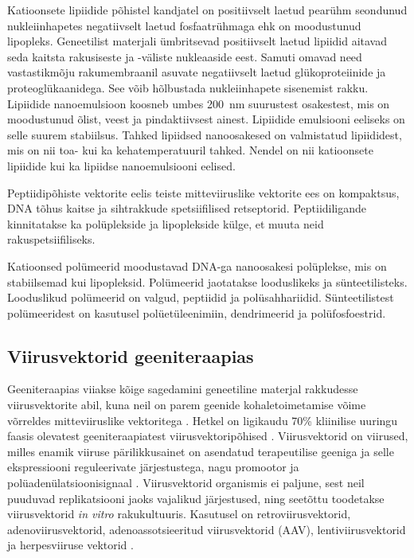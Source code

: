 \documentclass{trkut}%
\begin{document}
Katioonsete lipiidide põhistel kandjatel on positiivselt laetud pearühm seondunud nukleiinhapetes negatiivselt laetud fosfaatrühmaga ehk on moodustunud lipopleks. Geneetilist materjali ümbritsevad positiivselt laetud lipiidid aitavad seda kaitsta rakusiseste ja -väliste nukleaaside eest. Samuti omavad need vastastikmõju rakumembraanil asuvate negatiivselt laetud glükoproteiinide ja proteoglükaanidega. See võib hõlbustada nukleiinhapete sisenemist rakku. Lipiidide nanoemulsioon koosneb umbes \SI{200}{\nano\metre} suurustest osakestest, mis on moodustunud õlist, veest ja pindaktiivsest ainest. Lipiidide emulsiooni eeliseks on selle suurem stabiilsus. Tahked lipiidsed nanoosakesed on valmistatud lipiididest, mis on nii toa- kui ka kehatemperatuuril tahked. Nendel on nii katioonsete lipiidide kui ka lipiidse nanoemulsiooni eelised. 

Peptiidipõhiste vektorite eelis teiste mitteviiruslike vektorite ees on kompaktsus, DNA tõhus kaitse ja sihtrakkude spetsiifilised retseptorid. Peptiidiligande kinnitatakse ka polüplekside ja lipoplekside külge, et muuta neid rakuspetsiifiliseks.

Katioonsed polümeerid moodustavad DNA-ga nanoosakesi polüplekse, mis on stabiilsemad kui lipopleksid. Polümeerid jaotatakse looduslikeks ja sünteetilisteks. Looduslikud polümeerid on valgud, peptiidid ja polüsahhariidid. Sünteetilistest polümeeridest on kasutusel polüetüleenimiin, dendrimeerid ja polüfosfoestrid. \parencite{genviisid}

\subsection{Viirusvektorid geeniteraapias}

Geeniteraapias viiakse kõige sagedamini geneetiline materjal rakkudesse viirusvektorite abil, kuna neil on parem geenide kohaletoimetamise võime võrreldes mitteviiruslike vektoritega \parencite{viirusvektoriteravi}. Hetkel on ligikaudu 70\% kliinilise uuringu faasis olevatest geeniteraapiatest viirusvektoripõhised \parencite{viirusvsmitte}. Viirusvektorid on viirused, milles enamik viiruse pärilikkusainet on asendatud terapeutilise geeniga ja selle ekspressiooni reguleerivate järjestustega, nagu promootor ja
polüadenülatsioonisignaal \parencite{vvkoostis}. Viirusvektorid organismis ei paljune, sest neil puuduvad replikatsiooni jaoks vajalikud järjestused, ning seetõttu toodetakse viirusvektorid \textit{in vitro} rakukultuuris. Kasutusel on retroviirusvektorid, adenoviirusvektorid, adenoassotsieeritud viirusvektorid (AAV), lentiviirusvektorid ja herpesviiruse vektorid \parencite{viirusvektorid}.
\end{document}
